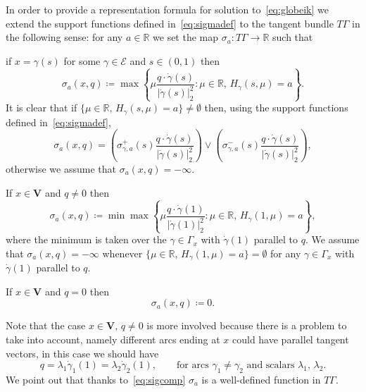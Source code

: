 \documentclass[11pt,a4paper,american]{article}
\newcommand{\Ecal}{\mathcal E}
\newcommand{\Rds}{\mathds R}
\newcommand{\Vbf}{\mathbf V}
\begin{document}
    In order to provide a representation formula for solution to~\cref{eq:globeik} we extend the support functions defined in~\cref{eq:sigmadef} to the tangent bundle $T\Gamma$ in the following sense: for any $a\in\Rds$ we set the map $\sigma_a:T\Gamma\to\Rds$ such that
    \begin{mylist}
        \item if $x=\gamma(s)$ for some $\gamma\in\Ecal$ and $s\in(0,1)$ then
        \begin{equation*}
            \sigma_a(x,q)\coloneqq\max\left\{\mu\frac{q\cdot\dot\gamma(s)}{|\dot\gamma(s)|_2^2}:\mu\in\Rds,\,H_\gamma(s,\mu)=a\right\}.
        \end{equation*}
        It is clear that if $\{\mu\in\Rds,\,H_\gamma(s,\mu)=a\}\ne\emptyset$ then, using the support functions defined in~\cref{eq:sigmadef},
        \begin{equation*}
            \sigma_a(x,q)=\left(\sigma_{\gamma,a}^+(s)\frac{q\cdot\dot\gamma(s)}{|\dot\gamma(s)|_2^2}\right)\vee\left(\sigma_{\gamma,a}^-(s)\frac{q\cdot\dot\gamma(s)}{|\dot\gamma(s)|_2^2}\right),
        \end{equation*}
        otherwise we assume that $\sigma_a(x,q)=-\infty$.
        \item If $x\in\Vbf$ and $q\ne0$ then
        \begin{equation*}
            \sigma_a(x,q)\coloneqq\min\max\left\{\mu\frac{q\cdot\dot\gamma(1)}{|\dot\gamma(1)|_2^2}:\mu\in\Rds,\,H_\gamma(1,\mu)=a\right\},
        \end{equation*}
        where the minimum is taken over the $\gamma\in\Gamma_x$ with $\dot\gamma(1)$ parallel to $q$. We assume that $\sigma_a(x,q)=-\infty$ whenever $\{\mu\in\Rds,\,H_\gamma(1,\mu)=a\}=\emptyset$ for any $\gamma\in\Gamma_x$ with $\dot\gamma(1)$ parallel to $q$.
        \item If $x\in\Vbf$ and $q=0$ then
        \begin{equation*}
            \sigma_a(x,q)\coloneqq0.
        \end{equation*}
    \end{mylist}
    Note that the case $x\in\Vbf$, $q\ne0$ is more involved because there is a problem to take into account, namely different arcs ending at $x$ could have parallel tangent vectors, in this case we should have
    \begin{equation*}
        q=\lambda_1\dot\gamma_1(1)=\lambda_2\dot\gamma_2(1),\qquad\text{for arcs $\gamma_1\ne\gamma_2$ and scalars $\lambda_1$, $\lambda_2$}.
    \end{equation*}
    We point out that thanks to~\cref{eq:sigcomp} $\sigma_a$ is a well-defined function in $T\Gamma$.
\end{document}
